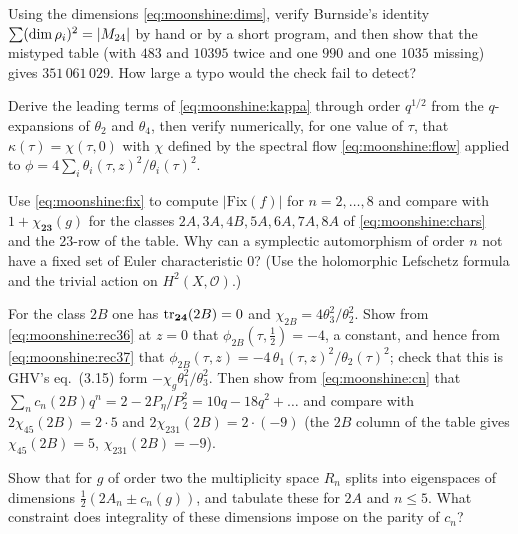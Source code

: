 \begin{exercise}[$\star$]\label{exo:moonshine:burnside}
Using the dimensions \eqref{eq:moonshine:dims}, verify Burnside's identity
$\sum(\dim\rho_i)^2=|M_{24}|$ by hand or by a short program, and then show that the mistyped
table (with $483$ and $10395$ twice and one $990$ and one $1035$ missing) gives
$351\,061\,029$. How large a typo would the check fail to detect?
\end{exercise}

\begin{exercise}[$\star\star$]\label{exo:moonshine:ns}
Derive the leading terms of \eqref{eq:moonshine:kappa} through order $q^{1/2}$ from the
$q$-expansions of $\theta_2$ and $\theta_4$, then verify numerically, for one value of
$\tau$, that $\kappa(\tau)=\chi(\tau,0)$ with $\chi$ defined by the spectral flow
\eqref{eq:moonshine:flow} applied to $\phi=4\sum_i\theta_i(\tau,z)^2/\theta_i(\tau)^2$.
\end{exercise}

\begin{exercise}[$\star\star$]\label{exo:moonshine:fix}
Use \eqref{eq:moonshine:fix} to compute $|\mathrm{Fix}(f)|$ for $n=2,\dots,8$ and compare
with $1+\chi_{\mathbf{23}}(g)$ for the classes $2A,3A,4B,5A,6A,7A,8A$ of
\eqref{eq:moonshine:chars} and the $23$-row of the table. Why can a symplectic automorphism
of order $n$ not have a fixed set of Euler characteristic $0$? (Use the holomorphic
Lefschetz formula and the trivial action on $H^2(X,\mathcal O)$.)
\end{exercise}

\begin{exercise}[$\star\star$]\label{exo:moonshine:2B}
For the class $2B$ one has $\operatorname{tr}_{\mathbf{24}}(2B)=0$ and $\chi_{2B}=4\theta_3^2/\theta_2^2$.
Show from \eqref{eq:moonshine:rec36} at $z=0$ that $\phi_{2B}(\tau,\tfrac12)=-4$, a
constant, and hence from \eqref{eq:moonshine:rec37} that
$\phi_{2B}(\tau,z)=-4\,\theta_1(\tau,z)^2/\theta_2(\tau)^2$; check that this is GHV's
eq.~(3.15) form $-\chi_g\theta_1^2/\theta_3^2$. Then show from \eqref{eq:moonshine:cn} that
$\sum_nc_n(2B)q^n=2-2P_\eta/P_2^2=10q-18q^2+\dots$ and compare with
$2\chi_{45}(2B)=2\cdot5$ and $2\chi_{231}(2B)=2\cdot(-9)$ (the $2B$ column of the table
gives $\chi_{45}(2B)=5$, $\chi_{231}(2B)=-9$).
\end{exercise}

\begin{exercise}[$\star\star$]\label{exo:moonshine:split}
Show that for $g$ of order two the multiplicity space $R_n$ splits into eigenspaces of
dimensions $\tfrac12(2A_n\pm c_n(g))$, and tabulate these for $2A$ and $n\le5$. What
constraint does integrality of these dimensions impose on the parity of $c_n$?
\end{exercise}

